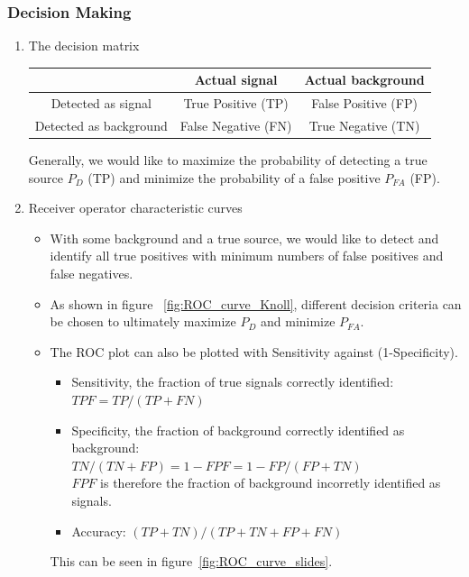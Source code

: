 \subsubsection{Decision Making}
\begin{enumerate}
    \item The decision matrix
    \begin{center}
    \begin{tabular}{|c|c|c|}
    \hline
     & Actual signal & Actual background \\
    \hline
    Detected as signal     &  True Positive (TP) & False Positive (FP) \\
    \hline
    Detected as background & False Negative (FN) & True Negative (TN) \\
    \hline
    \end{tabular}
    \end{center}
    Generally, we would like to maximize the probability of detecting a true source $P_D$ (TP) and minimize the probability of a false positive $P_{FA}$ (FP).
    \item Receiver operator characteristic curves
    \begin{itemize}
        \item With some background and a true source, we would like to detect and identify all true positives with minimum numbers of false positives and false negatives. 
        \item As shown in figure ~\ref{fig:ROC_curve_Knoll}, different decision criteria can be chosen to ultimately maximize $P_D$ and minimize $P_{FA}$.
        \item The ROC plot can also be plotted with Sensitivity against (1-Specificity).
        \begin{itemize}
            \item Sensitivity, the fraction of true signals correctly identified: \\$TPF=TP/(TP+FN)$
            \item Specificity, the fraction of background correctly identified as background:\\ $TN/(TN+FP)=1-FPF=1-FP/(FP+TN)$\\
            $FPF$ is therefore the fraction of background incorretly identified as signals.
            \item Accuracy: $(TP+TN)/(TP+TN+FP+FN)$
        \end{itemize}
        This can be seen in figure~\ref{fig:ROC_curve_slides}.
    \end{itemize}

\end{enumerate}
